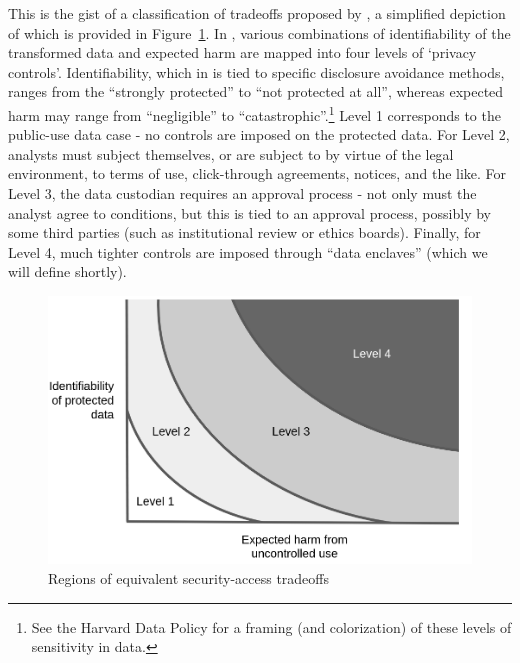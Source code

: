 This is the gist of a classification of tradeoffs proposed by \cite{altman_towards_2015},  a simplified depiction of which is provided in Figure~\ref{fig:altman-2015-mod}. In \cite{altman_towards_2015}, various combinations of identifiability of the transformed data and expected harm are mapped into four levels of `privacy controls'. Identifiability, which in \cite{altman_towards_2015} is tied to specific disclosure avoidance methods, ranges from the ``strongly protected'' to ``not protected at all'', whereas expected harm may range from ``negligible'' to ``catastrophic''.\footnote{See  the Harvard Data Policy  \cite{harvard_university_data_nodate} for a framing (and colorization) of these levels of sensitivity in data.}
  Level 1 corresponds to the public-use data case - no controls are imposed on the protected data. For Level 2, analysts must subject themselves, or are subject to by virtue of the legal environment, to terms of use, click-through agreements, notices, and the like. For Level 3, the data custodian requires an approval process - not only must the analyst agree to conditions, but this is tied to an approval process, possibly by some third parties (such as institutional review or ethics boards). Finally, for Level 4, much tighter controls are imposed through ``data enclaves'' (which we will define shortly). 

\begin{figure}
    \centering
    \includegraphics[width=\textwidth]{altman-2015-mod.png}
    \caption{Regions of equivalent security-access tradeoffs}
    \label{fig:altman-2015-mod}
\end{figure}

